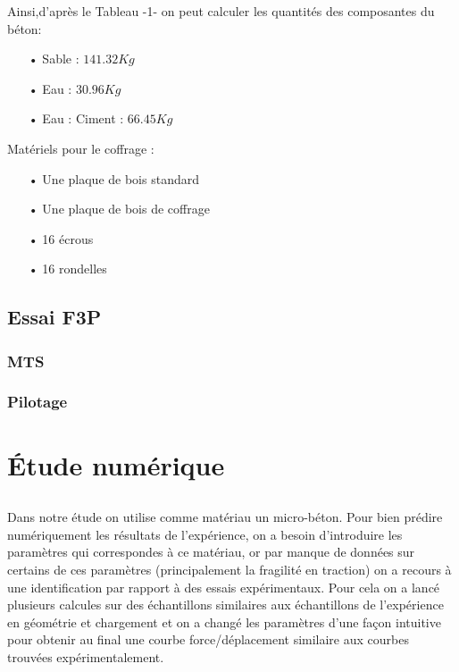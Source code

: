 \documentclass[12pt]{report}
\begin{document}
Ainsi,d’après le Tableau -1- on peut calculer les quantités des composantes du béton:\\

\begin{itemize}
\item[•] Sable : $141.32 Kg$
\item[•] Eau : $30.96 Kg$
\item[•] Eau : Ciment : $66.45 Kg$\\
\end{itemize}

Matériels pour le coffrage :\\

\begin{itemize}
\item[•] Une plaque de bois standard
\item[•] Une plaque de bois de coffrage
\item[•] 16 écrous
\item[•] 16 rondelles
\end{itemize}

\chapter{Essai F3P}
\section{MTS}

\section{Pilotage}



\part{Étude numérique}
\chapter*{}
Dans notre étude on utilise comme matériau un micro-béton. Pour bien prédire numériquement
les résultats de l’expérience, on a besoin d’introduire les paramètres qui correspondes à ce
matériau, or par manque de données sur certains de ces paramètres (principalement la fragilité en
traction) on a recours à une identification par rapport à des essais expérimentaux. Pour cela on a
lancé plusieurs calcules sur des échantillons similaires aux échantillons de l’expérience en
géométrie et chargement et on a changé les paramètres d’une façon intuitive pour obtenir au final
une courbe force/déplacement similaire aux courbes trouvées expérimentalement.
\end{document}
